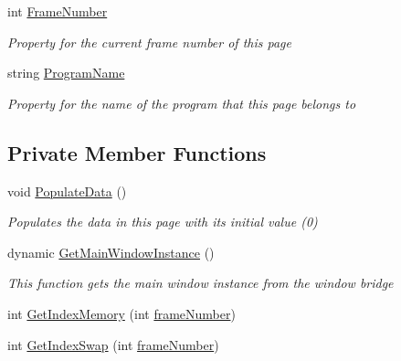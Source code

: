 \begin{DoxyCompactItemize}
int \hyperlink{class_c_p_u___o_s___simulator_1_1_memory_1_1_memory_page_a89857b70d4065fdc15ce2ea577a7f0ff}{Frame\+Number}
\begin{DoxyCompactList}\small\item\em Property for the current frame number of this page \end{DoxyCompactList}\item 
string \hyperlink{class_c_p_u___o_s___simulator_1_1_memory_1_1_memory_page_a22a8274576829c0a4e769189a8d10a9e}{Program\+Name}
\begin{DoxyCompactList}\small\item\em Property for the name of the program that this page belongs to \end{DoxyCompactList}\end{DoxyCompactItemize}
\subsection*{Private Member Functions}
\begin{DoxyCompactItemize}
\item 
void \hyperlink{class_c_p_u___o_s___simulator_1_1_memory_1_1_memory_page_a4006da1460cb3bf17076dfbade9d0038}{Populate\+Data} ()
\begin{DoxyCompactList}\small\item\em Populates the data in this page with its initial value (0) \end{DoxyCompactList}\item 
dynamic \hyperlink{class_c_p_u___o_s___simulator_1_1_memory_1_1_memory_page_a84a305171941df5c3ae72b34ccec5485}{Get\+Main\+Window\+Instance} ()
\begin{DoxyCompactList}\small\item\em This function gets the main window instance from the window bridge \end{DoxyCompactList}\item 
int \hyperlink{class_c_p_u___o_s___simulator_1_1_memory_1_1_memory_page_ae2fa532bdd07c5c939602ea5b223a2d2}{Get\+Index\+Memory} (int \hyperlink{class_c_p_u___o_s___simulator_1_1_memory_1_1_memory_page_aa2201f66e00641ff4eb07f881ac5413f}{frame\+Number})
\item 
int \hyperlink{class_c_p_u___o_s___simulator_1_1_memory_1_1_memory_page_a88d1bc7d56177569f81a9d1289022598}{Get\+Index\+Swap} (int \hyperlink{class_c_p_u___o_s___simulator_1_1_memory_1_1_memory_page_aa2201f66e00641ff4eb07f881ac5413f}{frame\+Number})
\end{DoxyCompactItemize}
